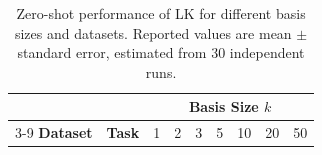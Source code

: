\documentclass{article}
\theoremstyle{plain}
\theoremstyle{definition}
\theoremstyle{remark}
\begin{document}
\begin{table}
\centering
\caption{Zero-shot performance of LK for different basis sizes and datasets. Reported values are mean $\pm$ standard error, estimated from 30 independent runs.}
\label{tab:lk_zero_shot_full_table}

\setlength{\tabcolsep}{7pt}
\renewcommand{\arraystretch}{1.2}

\footnotesize

\begin{tabular}{l l r r r r r r r}
\toprule
 & & \multicolumn{7}{c}{\textbf{Basis Size $k$}} \\
\cmidrule(lr){3-9}
\textbf{Dataset} & \textbf{Task}
& \multicolumn{1}{c}{1}
& \multicolumn{1}{c}{2}
& \multicolumn{1}{c}{3}
& \multicolumn{1}{c}{5}
& \multicolumn{1}{c}{10}
& \multicolumn{1}{c}{20}
& \multicolumn{1}{c}{50} \\
\midrule



\end{tabular}
\end{table}
\end{document}
